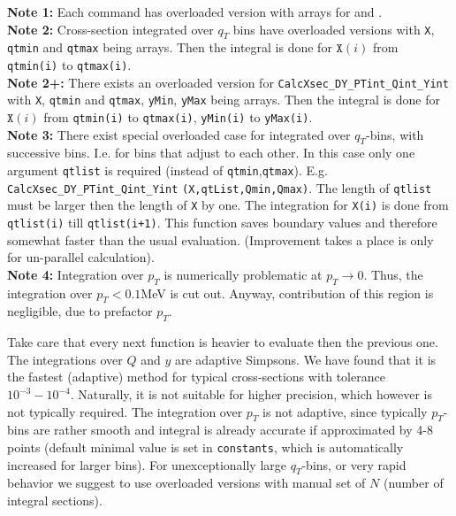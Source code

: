 \documentclass[prd,nofootinbib,eqsecnum,final]{revtex4}
\renewcommand{\(}{\left(}
\renewcommand{\)}{\right)}
\renewcommand{\[}{\left[}
\renewcommand{\]}{\right]}
\begin{document}
\begin{tcolorbox}
\textbf{Note 1:} Each command has overloaded version with arrays for  and .
\\
\textbf{Note 2:} Cross-section integrated over $q_T$ bins have overloaded versions with \texttt{X}, \texttt{qtmin} and \texttt{qtmax} being arrays. Then the integral is done for $\texttt{X}(i)$ from \texttt{qtmin(i)} to \texttt{qtmax(i)}.
\\
\textbf{Note 2+:} There exists an overloaded version for \texttt{CalcXsec\_DY{\_}PTint{\_}Qint{\_}Yint} with \texttt{X}, \texttt{qtmin} and \texttt{qtmax}, \texttt{yMin}, \texttt{yMax} being arrays. Then the integral is done for $\texttt{X}(i)$ from \texttt{qtmin(i)} to \texttt{qtmax(i)}, \texttt{yMin(i)} to \texttt{yMax(i)}.
\\
\textbf{Note 3:} There exist special overloaded case for integrated over $q_T$-bins, with successive bins. I.e. for bins that adjust to each other. In this case only one argument \texttt{qtlist} is required (instead of \texttt{qtmin},\texttt{qtmax}). E.g. \texttt{CalcXsec\_DY{\_}PTint{\_}Qint{\_}Yint} \texttt{(X,qtList,Qmin,Qmax)}. The length of \texttt{qtlist} must be larger then the length of \texttt{X} by one. The integration for \texttt{X(i)} is done from \texttt{qtlist(i)} till \texttt{qtlist(i+1)}. This function saves boundary values and therefore somewhat faster than the usual evaluation. (Improvement takes a place is only for un-parallel calculation).
\\\textbf{Note 4:} Integration over $p_T$ is numerically problematic at $p_T\to 0$. Thus, the integration over $p_T<0.1$MeV is cut out. Anyway, contribution of this region is negligible, due to prefactor $p_T$.
\end{tcolorbox}

Take care that every next function is heavier to evaluate then the previous one. The integrations over $Q$ and $y$ are adaptive Simpsons. We have found that it is the fastest (adaptive) method for typical cross-sections with tolerance $10^{-3}-10^{-4}$. Naturally, it is not suitable for higher precision, which however is not typically required. The integration over $p_T$ is not adaptive, since typically $p_T$-bins are rather smooth and integral is already accurate if approximated by 4-8 points (default minimal value is set in \texttt{constants}, which is automatically increased for larger bins). For unexceptionally large $q_T$-bins, or very rapid behavior we suggest to use overloaded versions with manual set of $N$ (number of integral sections).
\end{document}
